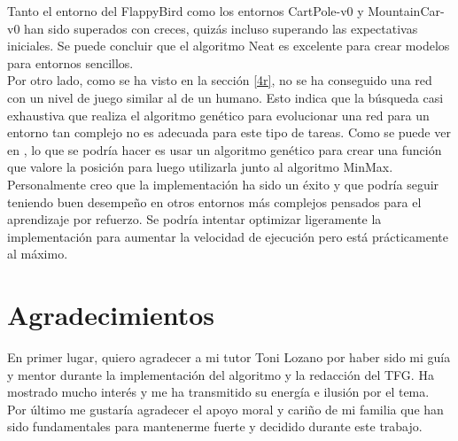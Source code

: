 \documentclass{article}
\begin{document}
Tanto el entorno del FlappyBird como los entornos CartPole-v0 y MountainCar-v0 han sido superados con creces, quizás incluso superando las expectativas iniciales. Se puede concluir que el algoritmo Neat es excelente para crear modelos para entornos sencillos.\\

Por otro lado, como se ha visto en la sección \ref{4r}, no se ha conseguido una red con un nivel de juego similar al de un humano.
Esto indica que la búsqueda casi exhaustiva que realiza el algoritmo genético para evolucionar una red para un entorno tan complejo no es adecuada para este tipo de tareas. 
Como se puede ver en \cite{Falcon}, lo que se podría hacer es usar un algoritmo genético para crear una función que valore la posición para luego utilizarla junto al algoritmo MinMax.\\

Personalmente creo que la implementación ha sido un éxito y que podría seguir teniendo buen desempeño en otros entornos más complejos pensados para el aprendizaje por refuerzo. Se podría intentar optimizar ligeramente la implementación para aumentar la velocidad de ejecución pero está prácticamente al máximo.





\section{Agradecimientos}
En primer lugar, quiero agradecer a mi tutor Toni Lozano por haber sido mi guía y mentor durante la implementación del algoritmo y la redacción del TFG. Ha mostrado mucho interés y me ha transmitido su energía e ilusión por el tema.\\

Por último me gustaría agradecer el apoyo moral y cariño de mi familia que han sido fundamentales para mantenerme fuerte y decidido durante este trabajo.



\end{document}
